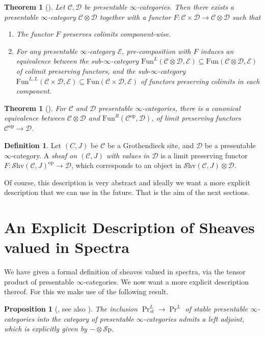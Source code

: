 \documentclass[10pt]{amsart}
\newcommand{\C}{\mathscr{C}}
\newcommand{\D}{\mathscr{D}}
\newcommand{\E}{\mathscr{E}}
\newcommand{\Sp}{\mathscr{S}\mathrm{p}}
\newcommand{\Fun}{\mathrm{Fun}}
\newcommand{\Shv}{\mathscr{S}\mathrm{hv}}
\newcommand{\op}{\mathrm{op}}
\newtheorem{theorem}[equation]{Theorem}
\newtheorem{proposition}[equation]{Proposition}
\theoremstyle{definition}
\newtheorem{definition}[equation]{Definition}
\theoremstyle{remark}
\numberwithin{equation}{section}
\begin{document}
\begin{theorem}[{\cite[Proposition 4.8.1.15]{lurie2017ha}}]
  Let $\C, \D$ be presentable $\infty$-categories. Then there exists a presentable $\infty$-category $\C \otimes \D$ together with a functor $F:\C\times\D\rightarrow\C\otimes\D$ such that 
  \begin{enumerate}
	\item The functor $F$ preserves colimits component-wise.
	\item For any presentable $\infty$-category $\E$, pre-composition with $F$ induces an equivalence between the sub-$\infty$-category $\Fun^L(\C \otimes \D , \E)\subseteq\Fun(\C \otimes \D , \E)$ of colimit preserving functors, and the sub-$\infty$-category $\Fun^{L,L}(\C \times \D, \E)\subseteq\Fun(\C\times\D,\E)$ of functors preserving colimits in each component. 
  \end{enumerate}
\end{theorem}
\begin{theorem}[{\cite[Proposition 4.8.1.17]{lurie2017ha}}]For $\C$ and $\D$ presentable $\infty$-categories, there is a canonical equivalence between $\C\otimes\D$ and $\Fun^R(\C^{\op},\D)$, of limit preserving functors $\C^{\op}\to\D$. 
\end{theorem}
\begin{definition}
  Let $(C,J)$ be $\C$ be a Grothendieck site, and $\D$ be a presentable $\infty$-category. A \emph{sheaf on $(\C,J)$ with values in $\D$} is a limit preserving functor $F\colon \Shv(\C,J)^{\op} \to \D$, which corresponds to an object in $\Shv(\C,J) \otimes \D$. 
\end{definition}

Of course, this description is very abstract and ideally we want a more explicit description that we can use in the future. That is the aim of the next sections.

\section{An Explicit Description of Sheaves valued in Spectra}

We have given a formal definition of sheaves valued in spectra, via the tensor product of presentable $\infty$-categories. We now want a more explicit description thereof. For this we make use of the following result.

\begin{proposition}[{\cite{lurie2017ha}, see also \cite{gepnergrothnikolaus2015infiniteloopspacemachine}}]
 The inclusion $\Pr^L_{st} \to \Pr^L$ of stable presentable $\infty$-categories into the category of presentable $\infty$-categories admits a left adjoint, which is explicitly given by $-\otimes\Sp$.
\end{proposition}
\end{document}
